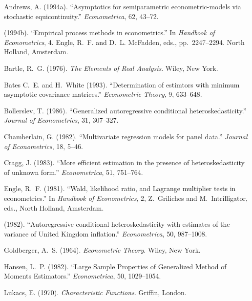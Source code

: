 \begin{description}
\item Andrews, A. (1994a). ``Asymptotics for semiparametric econometric-models via stochastic equicontinuity.'' \textit{Econometrica}, 62, 43--72.

\item[\textemdash\textemdash\textemdash] (1994b). ``Empirical process methods in econometrics.'' In \textit{Handbook of Econometrics}, 4. Engle, R.~F. and D.~L. McFadden, eds., pp.~2247--2294. North Holland, Amsterdam.

\item Bartle, R.~G. (1976). \textit{The Elements of Real Analysis}. Wiley, New York.

\item Bates C.~E. and H.~White (1993). ``Determination of estimtors with minimum asymptotic covariance matrices.'' \textit{Econometric Theory}, 9, 633--648.

\item Bollerslev, T. (1986). ``Generalized autoregressive conditional heteroskedasticity.'' \textit{Journal of Econometrics}, 31, 307--327.

\item Chamberlain, G. (1982). ``Multivariate regression models for panel data.'' \textit{Journal of Econometrics}, 18, 5--46.

\item Cragg, J. (1983). ``More efficient estimation in the presence of heteroskedasticity of unknown form.'' \textit{Econometrica}, 51, 751--764.

\item Engle, R.~F. (1981). ``Wald, likelihood ratio, and Lagrange multiplier tests in econometrics.'' In \textit{Handbook of Econometrics}, 2, Z.~Griliches and M.~Intrilligator, eds., North Holland, Amsterdam.

\item[\textemdash\textemdash\textemdash] (1982). ``Autoregressive conditional heteroskedasticity with estimates of the variance of United Kingdom inflation.'' \textit{Econometrica}, 50, 987--1008.

\item Goldberger, A.~S. (1964). \textit{Econometric Theory}. Wiley, New York.

\item Hansen, L.~P. (1982). ``Large Sample Properties of Generalized Method of Moments Estimators.'' \textit{Econometrica}, 50, 1029--1054.

\item Lukacs, E. (1970). \textit{Characteristic Functions}. Griffin, London.


\end{description}
